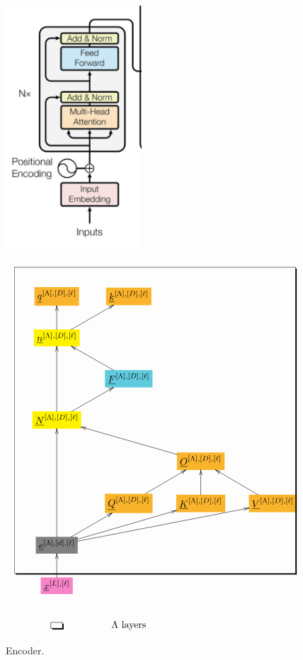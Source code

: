 \documentclass[12pt]{article}
\begin{document}
\begin{figure}[h!]\centering
\begin{minipage}{.5\linewidth}
\includegraphics[width=2in]{encoder.jpg}
\end{minipage}%
\begin{minipage}{.5\linewidth}
$$\xymatrix{
*+[F*:Dandelion]{\underline{q}^{[\Lambda],[D], [\ell]}}&*+[F*:Dandelion]{\underline{k}^{[\Lambda],[D], [\ell]}}&&
\\
*+[F*:yellow]{\underline{n}^{[\Lambda],[D], [\ell]}}\ar[ur]\ar[u]&&&
\\
&*+[F*:SkyBlue]{\underline{F}^{[\Lambda],[D], [\ell]}}\ar[ul]&&
\\
*+[F*:yellow]{\underline{N}^{[\Lambda],[D], [\ell]}}\ar[ur]\ar[uu]&&&
\\
&&*+[F*:Dandelion]{\underline{O}^{[\Lambda],[D], [\ell]}}\ar[ull]&
\\
&*+[F*:Dandelion]{\underline{Q}^{[\Lambda],[D], [\ell]}}\ar[ur]&*+[F*:Dandelion]{\underline{K}^{[\Lambda],[D], [\ell]}}\ar[u]&*+[F*:Dandelion]{\underline{V}^{[\Lambda],[D],[\ell]}}\ar[ul]
\\
*+[F*:gray]{\underline{e}^{[\Lambda],[d], [\ell]}}\ar[urr]\ar[uuu]\ar[ur]\ar[urrr]&&&
\\
*+[F*:Lavender]{\underline{x}^{[L],[\ell]}}\ar[u]&&&
\save
\POS"1,1"."7,1"."1,4"."7,4"!C*+<4.0em>\frm{-,}
\restore
\\
*+[F-,]{\;\;}&\text{$\Lambda$ layers}
}$$
\end{minipage}
\caption{Encoder.}
\label{fig-texnn-for-encoder}
\end{figure}
\end{document}
